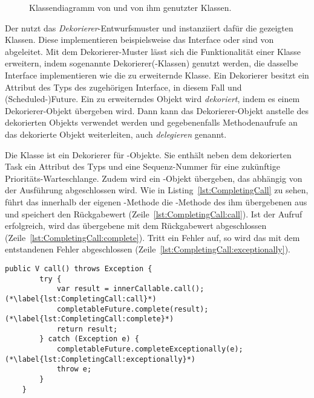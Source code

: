 \begin{figure}[htbp]
	\centering
	
	\caption{Klassendiagramm von \classCompletableFutureWrapper{} und von ihm genutzter Klassen.}\label{fig:wrapper}
\end{figure}

Der \classCompletableFutureWrapper{} nutzt das \emph{Dekorierer}-Entwurfsmuster  und instanziiert dafür die gezeigten Klassen. Diese implementieren beispielsweise das Interface \classCallable{} oder sind von \classCompletableFuture{} abgeleitet. Mit dem Dekorierer-Muster lässt sich die Funktionalität einer Klasse erweitern, indem sogenannte Dekorierer(-Klassen) genutzt werden, die dasselbe Interface implementieren wie die zu erweiternde Klasse. Ein Dekorierer besitzt ein Attribut des Typs des zugehörigen Interface, in diesem Fall \classCallable{} und \class(Scheduled-)Future{}. Ein zu erweiterndes Objekt wird \emph{dekoriert}, indem es einem Dekorierer-Objekt übergeben wird. Dann kann das Dekorierer-Objekt anstelle des dekorierten Objekts verwendet werden und gegebenenfalls Methodenaufrufe an das dekorierte Objekt weiterleiten, auch \emph{delegieren} genannt.


Die Klasse \classCompletingCallable{} ist ein Dekorierer für \classCallable{}-Objekte. Sie enthält neben dem dekorierten Task  ein Attribut des Typs \classTaskPriority{} und eine Sequenz-Nummer für eine zukünftige Prioritäts-Warteschlange. Zudem wird ein \classCompletableFuture{}-Objekt übergeben, das abhängig von der Ausführung abgeschlossen wird. Wie in Listing~\ref{lst:CompletingCall} zu sehen, führt das \classCompletingCallable{} innerhalb der eigenen -Methode die -Methode des ihm übergebenen \classCallable{}  aus und speichert den Rückgabewert (Zeile~\ref{lst:CompletingCall:call}). Ist der Aufruf erfolgreich, wird das übergebene \classCompletableFuture{} mit dem Rückgabewert abgeschlossen (Zeile~\ref{lst:CompletingCall:complete}). Tritt ein Fehler auf, so wird das  \classCompletableFuture{} mit dem entstandenen Fehler abgeschlossen (Zeile~\ref{lst:CompletingCall:exceptionally}).

\begin{lstlisting}[caption={\tcode{call()}-Methode von \classCompletingCallable{}. Das enthaltene \classCallable{} wird ausgeführt und dann das \classCompletableFuture{} abgeschlossen.}, label={lst:CompletingCall},float={thbp}]
	public V call() throws Exception {
		try {
			var result = innerCallable.call(); (*\label{lst:CompletingCall:call}*)
			completableFuture.complete(result); (*\label{lst:CompletingCall:complete}*)
			return result;
		} catch (Exception e) {
			completableFuture.completeExceptionally(e); (*\label{lst:CompletingCall:exceptionally}*)
			throw e;
		}
	}
\end{lstlisting}


